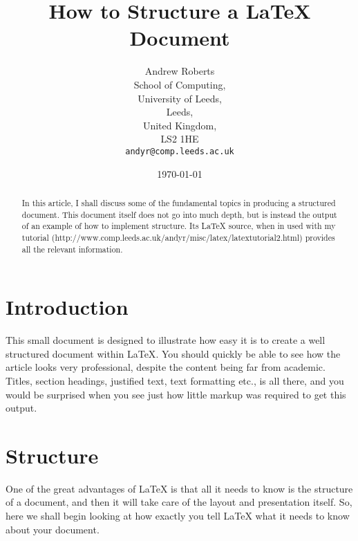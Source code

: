 \documentclass{article}
\begin{document}
\title{How to Structure a \LaTeX{} Document} %
\author{Andrew Roberts\\
        School of Computing,\\
		University of Leeds,\\
		Leeds,\\
		United Kingdom,\\
		LS2 1HE\\
		\texttt{andyr@comp.leeds.ac.uk}}  %
\date{\today}  %
\maketitle

\begin{abstract}
In this article, I shall discuss some of the fundamental topics in
producing a structured document.  This document itself does not go into
much depth, but is instead the output of an example of how to implement
structure. Its \LaTeX{} source, when in used with my tutorial
(http://www.comp.leeds.ac.uk/andyr/misc/latex/\-latextutorial2.html)
provides all the relevant information.  \end{abstract}

\section{Introduction}
This small document is designed to illustrate how easy it is to create a
well structured document within \LaTeX\cite{lamport94}.  You should quickly be able to
see how the article looks very professional, despite the content being
far from academic.  Titles, section headings, justified text, text
formatting etc., is all there, and you would be surprised when you see
just how little markup was required to get this output.

\section{Structure}
One of the great advantages of \LaTeX{} is that all it needs to know is
the structure of a document, and then it will take care of the layout
and presentation itself.  So, here we shall begin looking at how exactly
you tell \LaTeX{} what it needs to know about your document.
\end{document}
